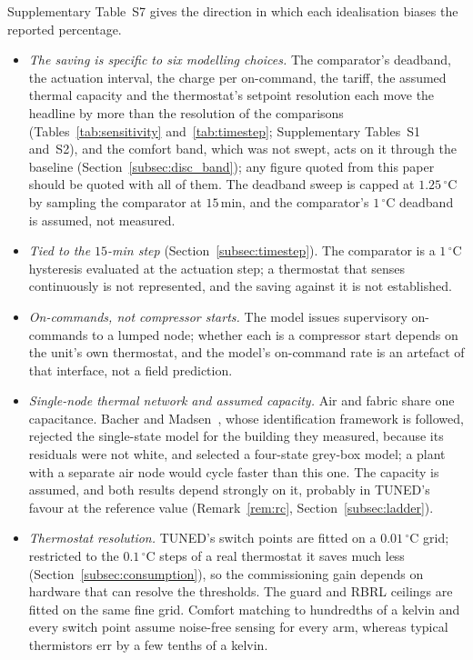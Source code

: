 \documentclass[3p,twocolumn,number]{elsarticle}
\begin{document}
Supplementary Table~S7 gives the direction in which each idealisation biases the reported percentage.
\begin{itemize}[leftmargin=*,itemsep=1pt,topsep=2pt]
\item \emph{The saving is specific to six modelling choices.} The comparator's
deadband, the actuation interval, the charge per on-command, the tariff, the assumed thermal capacity and the thermostat's setpoint resolution each move the headline by more than the resolution of the comparisons (Tables~\ref{tab:sensitivity} and~\ref{tab:timestep}; Supplementary Tables~S1 and~S2), and the comfort band, which was not swept, acts on it through the baseline (Section~\ref{subsec:disc_band}); any figure quoted from this paper should be quoted with all of them. The deadband sweep is capped at $1.25\,^\circ$C by sampling the comparator at $15\,$min, and the comparator's $1\,^\circ$C deadband is assumed, not measured.
\item \emph{Tied to the $15$-min step} (Section~\ref{subsec:timestep}).
The comparator is a $1\,^\circ$C hysteresis evaluated at the actuation step; a thermostat that senses continuously is not represented, and the saving against it is not established.
\item \emph{On-commands, not compressor starts.} The model issues supervisory
on-commands to a lumped node; whether each is a compressor start depends on the unit's own thermostat, and the model's on-command rate is an artefact of that interface, not a field prediction.
\item \emph{Single-node thermal network and assumed capacity.} Air and fabric
share one capacitance. Bacher and Madsen~\cite{Bacher2011}, whose identification framework is followed, rejected the single-state model for the building they measured, because its residuals were not white, and selected a four-state grey-box model; a plant with a separate air node would cycle faster than this one. The capacity is assumed, and both results depend strongly on it, probably in TUNED's favour at the reference value (Remark~\ref{rem:rc}, Section~\ref{subsec:ladder}).
\item \emph{Thermostat resolution.} TUNED's switch points are fitted on a
$0.01\,^\circ$C grid; restricted to the $0.1\,^\circ$C steps of a real thermostat it saves much less (Section~\ref{subsec:consumption}), so the commissioning gain depends on hardware that can resolve the thresholds. The guard and RBRL ceilings are fitted on the same fine grid. Comfort matching to hundredths of a kelvin and every switch point assume noise-free sensing for every arm, whereas typical thermistors err by a few tenths of a kelvin.

\end{itemize}
\end{document}
